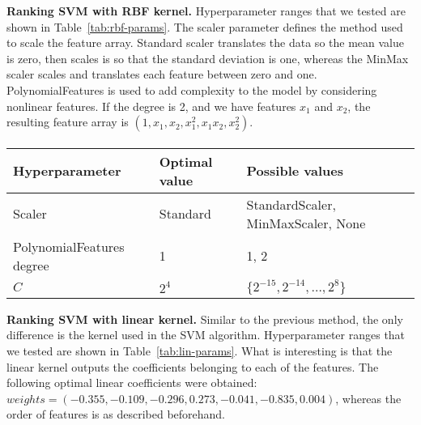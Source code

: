 \documentclass[10pt, a4paper]{article}
\begin{document}
\textbf{Ranking SVM with RBF kernel.} Hyperparameter ranges that we tested are shown in Table~\ref{tab:rbf-params}. The scaler parameter defines the method used to scale the feature array. Standard scaler translates the data so the mean value is zero, then scales is so that the standard deviation is one, whereas the MinMax scaler scales and translates each feature between zero and one. PolynomialFeatures is used to add complexity to the model by considering nonlinear features. If the degree is 2, and we have features $x_1$ and $x_2$, the resulting feature array is $(1, x_1, x_2, x_1^2, x_1x_2, x_2^2)$. \paragraph{}

\begin{table*}
\caption{Hyperparameter ranges for Ranking SVM with linear kernel.}
\label{tab:lin-params}
\begin{center}
\begin{tabular}{lll}
\toprule
Hyperparameter & Optimal value & Possible values \\
\midrule
Scaler & Standard &  StandardScaler, MinMaxScaler, None \\
PolynomialFeatures degree & 1 & 1, 2  \\
$C$ & $2^4$ & $\{2^{-15}, 2^{-14}, \ldots, 2^{8}\}$ \\
\bottomrule
\end{tabular}
\end{center}
\end{table*}

\textbf{Ranking SVM with linear kernel.} Similar to the previous method, the only difference is the kernel used in the SVM algorithm. Hyperparameter ranges that we tested are shown in Table~\ref{tab:lin-params}. What is interesting is that the linear kernel outputs the coefficients belonging to each of the features. The following optimal linear coefficients were obtained:
$ weights = (-0.355, -0.109, -0.296, 0.273, -0.041, -0.835,  0.004)$, whereas the order of features is as described beforehand. \paragraph{}
\end{document}
